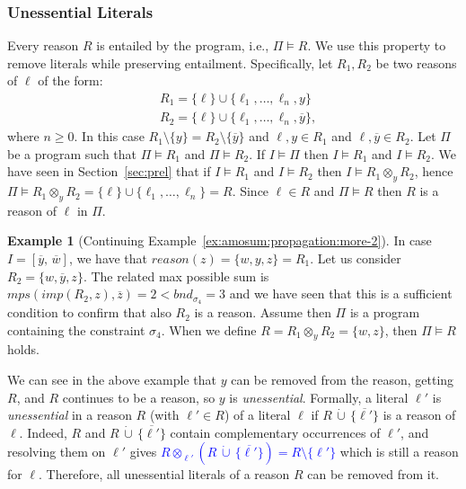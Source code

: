 \documentclass[preprint,authoryear]{elsarticle}
\newcommand{\mps}{\mathit{mps}}
\newcommand{\bnd}{\mathit{bnd}}
\newcommand{\cupdot}{\,\dot{\cup}\,}
\theoremstyle{definition}
\newtheorem{example}{Example}[section]
\begin{document}
\subsubsection*{Unessential Literals}
\label{sec:properties_reason}
Every reason $R$ is entailed by the program, i.e., $\Pi \models R$.
We use this property to remove literals while preserving entailment. 
Specifically, let $R_1,R_2$ be two reasons of $\ell$ of the form:
\begin{align}
    \label{eq:reasons_1}
    &R_1 = \{\ell\} \cup \{\ell_1, \hdots, \ell_n, y\} \\ 
    \label{eq:reasons_2}
    &R_2 = \{\ell\} \cup \{\ell_1, \hdots, \ell_n, \overline{y}\}, 
\end{align}
where $n \ge 0$.
In this case $R_1 \setminus \{y\} = R_2 \setminus \{\overline{y}\}$ and $\ell,y \in R_1$ and $\ell,\overline{y} \in R_2$.
Let $\Pi$ be a program such that $\Pi \models R_1$ and $\Pi \models R_2$.
If $I \models \Pi$ then $I \models R_1$ and $I \models R_2$.
We have seen in Section~\ref{sec:prel} that if $I \models R_1$ and $I \models R_2$ then $I \models  R_1 \otimes_{y} R_2$, hence $\Pi \models R_1 \otimes_{y} R_2 = \{\ell\} \cup \{\ell_1, \hdots, \ell_n\} = R$.
Since $\ell \in R$ and $\Pi \models R$ then $R$ is a reason of $\ell$ in $\Pi$.
\begin{example}[Continuing Example~\ref{ex:amosum:propagation:more-2}]
    In case $I=[\overline{y},\, \overline{w}]$, we have that $\mathit{reason}(z)=\{w, y, z\} = R_1$.
    Let us consider $R_2 =\{w, \overline{y}, z\}$.
    The related max possible sum is $\mps(\mathit{imp}(R_2,z), \overline{z}) = 2 < \bnd_{\sigma_4} = 3$ and we have seen that this is a sufficient condition to confirm that also $R_2$ is a reason.
    Assume then $\Pi$ is a program containing 
    the constraint $\sigma_4$. When we define 
    $R = R_1 \otimes_y R_2 = \{w, z\}$, then $ \Pi \models R$ holds.
\end{example}
We can see in the above example that $y$ can be removed from the reason, getting $R$, and $R$ continues to be a reason, so $y$ is \textit{unessential}.
Formally, a literal $\ell'$ is \textit{unessential} in a reason $R$ (with $\ell' \in R$) of a literal $\ell$ if $R \cupdot \{\overline{\ell'}\}$ is a reason of $\ell$.
Indeed, $R$ and $R \cupdot \{\overline{\ell'}\}$ contain complementary occurrences of $\ell'$, and resolving them on $\ell'$ gives \textcolor{blue}{$R \otimes_{\ell'} (R \cupdot \{\overline{\ell'}\}) = R \setminus \{\ell'\}$} which is still a reason for $\ell$.
Therefore, all unessential literals of a reason $R$ can be removed from it.
\end{document}
